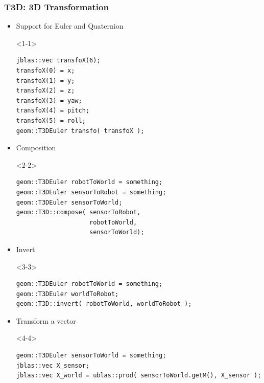 \documentclass[compress]{beamer}
\begin{document}
\begin{frame}[fragile]
  \frametitle{T3D: 3D Transformation}
  \begin{itemize}
    \item<1-> Support for Euler and Quaternion
      \begin{onlyenv}<1-1>
        \begin{lstlisting}
jblas::vec transfoX(6);
transfoX(0) = x;
transfoX(1) = y;
transfoX(2) = z;
transfoX(3) = yaw;
transfoX(4) = pitch;
transfoX(5) = roll;
geom::T3DEuler transfo( transfoX );
        \end{lstlisting}
      \end{onlyenv}
    \item<2-> Composition
      \begin{onlyenv}<2-2>
        \begin{lstlisting}
geom::T3DEuler robotToWorld = something;
geom::T3DEuler sensorToRobot = something;
geom::T3DEuler sensorToWorld;
geom::T3D::compose( sensorToRobot, 
                    robotToWorld,
                    sensorToWorld);
        \end{lstlisting}
      \end{onlyenv}
    \item<3-> Invert
      \begin{onlyenv}<3-3>
        \begin{lstlisting}
geom::T3DEuler robotToWorld = something;
geom::T3DEuler worldToRobot;
geom::T3D::invert( robotToWorld, worldToRobot );
        \end{lstlisting}
      \end{onlyenv}
    \item<4-> Transform a vector
      \begin{onlyenv}<4-4>
        \begin{lstlisting}
geom::T3DEuler sensorToWorld = something;
jblas::vec X_sensor;
jblas::vec X_world = ublas::prod( sensorToWorld.getM(), X_sensor );
        \end{lstlisting}
      \end{onlyenv}
    
  \end{itemize}
\end{frame}

\end{document}
